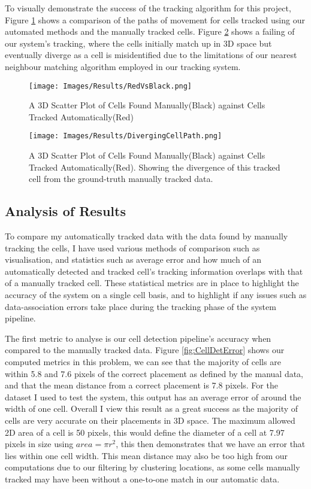 \documentclass[12pt a4paper]{article}
\begin{document}
To visually demonstrate the success of the tracking algorithm for this project, Figure \ref{fig:redBlack} shows a comparison of the paths of movement for cells tracked using our automated methods and the manually tracked cells. Figure \ref{fig:diverge} shows a failing of our system's tracking, where the cells initially match up in 3D space but eventually diverge as a cell is misidentified due to the limitations of our nearest neighbour matching algorithm employed in our tracking system.

\begin{figure}
    \centering
    \texttt{[image: Images/Results/RedVsBlack.png]}
    \caption{A 3D Scatter Plot of Cells Found Manually(Black) against Cells Tracked Automatically(Red)}
    \label{fig:redBlack}
\end{figure}


\begin{figure}
    \centering
    \texttt{[image: Images/Results/DivergingCellPath.png]}
    \caption{A 3D Scatter Plot of Cells Found Manually(Black) against Cells Tracked Automatically(Red). Showing the divergence of this tracked cell from the ground-truth manually tracked data.}
    \label{fig:diverge}
\end{figure}

\subsection{Analysis of Results}
To compare my automatically tracked data with the data found by manually tracking the cells, I have used various methods of comparison such as visualisation, and statistics such as average error and how much of an automatically detected and tracked cell's tracking information overlaps with that of a manually tracked cell. These statistical metrics are in place to highlight the accuracy of the system on a single cell basis, and to highlight if any issues such as data-association errors take place during the tracking phase of the system pipeline.

The first metric to analyse is our cell detection pipeline's accuracy when compared to the manually tracked data. Figure \ref{fig:CellDetError} shows our computed metrics in this problem, we can see that the majority of cells are within 5.8 and 7.6 pixels of the correct placement as defined by the manual data, and that the mean distance from a correct placement is 7.8 pixels. For the dataset I used to test the system, this output has an average error of around the width of one cell. Overall I view this result as a great success as the majority of cells are very accurate on their placements in 3D space. The maximum allowed 2D area of a cell is 50 pixels, this would define the diameter of a cell at 7.97 pixels in size using $ area = \pi r^2$, this then demonstrates that we have an error that lies within one cell width. This mean distance may also be too high from our computations due to our filtering by clustering locations, as some cells manually tracked may have been without a one-to-one match in our automatic data.
\end{document}
